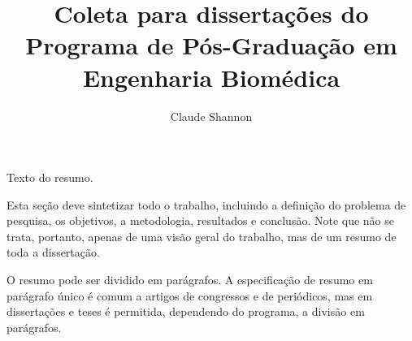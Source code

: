 \documentclass[a4paper, 12pt]{ppgeb}
\title{Coleta para dissertações do \\Programa de Pós-Graduação em Engenharia Biomédica}
\author{Claude Shannon}
\begin{document}
\maketitle

%
%
%
%
%
%

%
%

%
%


\acresetall %
\vspace{12pt}

Texto do resumo.

Esta seção deve sintetizar todo o trabalho, incluindo a definição do problema de pesquisa, os objetivos, a metodologia, resultados e conclusão. Note que não se trata, portanto, apenas de uma visão geral do trabalho, mas de um resumo de toda a dissertação.

O resumo pode ser dividido em parágrafos. A especificação de resumo em parágrafo único é comum a artigos de congressos e de periódicos, mas em dissertações e teses é permitida, dependendo do programa, a divisão em parágrafos.

\vspace{14pt}
\end{document}

